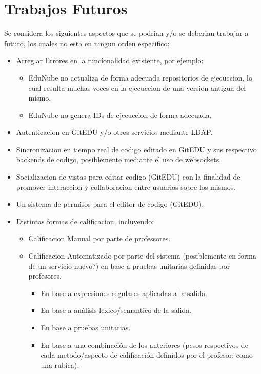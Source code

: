 \section{Trabajos Futuros}
Se considera los siguientes aspectos que se podrian y/o se deberian trabajar a futuro, los cuales no esta en ningun orden especifico:
\begin{itemize}
	\item Arreglar Errores en la funcionalidad existente, por ejemplo:
    \begin{itemize}
    	\item EduNube no actualiza de forma adecuada repositorios de ejecuccion, lo cual resulta muchas veces en la ejecuccion de una version antigua del mismo.
        \item EduNube no genera IDs de ejecuccion de forma adecuada.
    \end{itemize}
    \item Autenticacion en GitEDU y/o otros servicios mediante LDAP.
    \item Sincronizacion en tiempo real de codigo editado en GitEDU y sus respectivo backends de codigo, posiblemente  mediante el uso de websockets.
    \item Socializacion de vistas para editar codigo (GitEDU) con la finalidad de promover interaccion y collaboracion entre usuarios sobre los mismos.
    \item Un sistema de permisos para el editor de codigo (GitEDU).
    \item Distintas formas de calificacion, incluyendo:
    \begin{itemize}
    	\item Calificacion Manual por parte de professores.
        \item Calificacion Automatizado por parte del sistema (posiblemente en forma de un servicio nuevo?) en base a pruebas unitarias definidas por profesores.
        \begin{itemize}
        	\item En base a expresiones regulares aplicadas a la salida.
            \item En base a análisis lexico/semantico de la salida.
            \item En base a pruebas unitarias.
            \item En base a una combinación de los anteriores (pesos respectivos de cada metodo/aspecto de calificación definidos por el profesor; como una rubica).
        \end{itemize}

\end{itemize}
\end{itemize}
